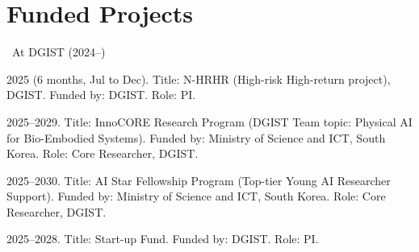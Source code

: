 \section{Funded Projects}

\vspace{2mm}
\ At DGIST (2024--)
\vspace{-1mm}
\begin{etaremune}
    \item 2025 (6 months, Jul to Dec). Title: N-HRHR (High-risk High-return project), DGIST. Funded by: DGIST. Role: PI.
    \vspace{-1mm}
    \item 2025--2029. Title: InnoCORE Research Program (DGIST Team topic: Physical AI for Bio-Embodied Systems). Funded by: Ministry of Science and ICT, South Korea. Role: Core Researcher, DGIST.
    \vspace{-1mm}
    \item 2025--2030. Title: AI Star Fellowship Program (Top-tier Young AI Researcher Support). Funded by: Ministry of Science and ICT, South Korea. Role: Core Researcher, DGIST.
    \vspace{-1mm}
    \item 2025--2028. Title: Start-up Fund. Funded by: DGIST. Role: PI.
    \vspace{-1mm}
\end{etaremune}

